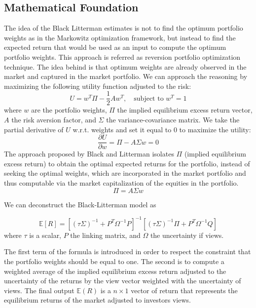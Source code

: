 \subsection{Mathematical Foundation}
The idea of the Black Litterman estimates is not to find the optimum portfolio weights as in the Markowitz optimization framework, but instead to find the expected return that would be used as an input to compute the optimum portfolio weights. This approach is referred as reversion portfolio optimization technique. The idea behind is that optimum weights are already observed in the market and captured in the market portfolio.
We can approach the reasoning by maximizing the following utility function adjusted to the risk:
\begin{equation}
U = w^T\Pi - \frac{1}{2}Aw^T,\quad\text{subject to }w^T=1
\end{equation}
where $w$ are the portfolio weights, $\Pi$ the implied equilibrium excess return vector, $A$ the risk aversion factor, and $\Sigma$ the variance-covariance matrix.
We take the partial derivative of $U$ w.r.t. weights and set it equal to 0 to maximize the utility:
\begin{equation*}
  \frac{\partial U}{\partial w} = \Pi - A\Sigma w = 0
\end{equation*}
The approach proposed by Black and Litterman isolates $\Pi$ (implied equilibrium excess return) to obtain the optimal expected returns for the portfolio, instead of seeking the optimal weights, which are incorporated in the market portfolio and thus computable via the market capitalization of the equities in the portfolio.
\begin{equation*}
  \Pi = A\Sigma w
\end{equation*}

We can deconstruct the Black-Litterman model as

\begin{equation}
  \mathbb{E}[R] = [(\tau\Sigma)^{-1}+P^T\Omega^{-1}P]^{-1}[(\tau\Sigma)^{-1}\Pi + P^T\Omega^{-1}Q]
\end{equation}
where $\tau$ is a scalar, $P$ the linking matrix, and $\Omega$ the uncertainty if views.

The first term of the formula is introduced in order to respect the constraint that the portfolio weights should be equal to one.
The second is to compute a weighted average of the implied equilibrium excess return adjusted to the uncertainty of the returns by the view vector weighted with the uncertainty of views.
The final output $\mathbb{E}(R)$ is a $n\times 1$ vector of return that represents the equilibrium returns of the market adjusted to investors views.

